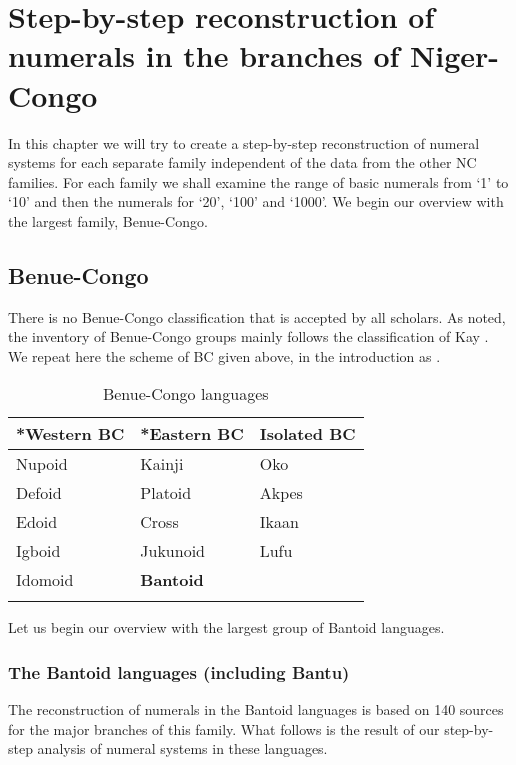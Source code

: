 \chapter{Step-by-step reconstruction of numerals in the branches of Niger-Congo} \label{sec:3}
In this chapter we will try to create a step-by-step reconstruction of numeral systems for each separate family independent of the data from the other NC families. For each family we shall examine the range of basic numerals from ‘1’ to ‘10’ and then the numerals for ‘20’, ‘100’ and ‘1000’. We begin our overview with the largest family, Benue-Congo. 

\section{Benue-Congo} %

There is no Benue-Congo classification that is accepted by all scholars. As noted, the inventory of Benue-Congo groups mainly follows the classification of Kay \citet[266--269]{Williamson1989b}. We repeat here the scheme of BC given above, in the introduction as .

\begin{table}
\caption{Benue-Congo languages}
\label{tab:3:bclg}
\begin{tabularx}{.8\textwidth}{XXl}
\lsptoprule
*Western BC & *Eastern BC & Isolated BC\\
\midrule 
Nupoid & Kainji & Oko\index{Oko!}\\
Defoid & Platoid & Akpes\index{Akpes!} \\
Edoid & Cross & Ikaan\index{Ikaan!}\\
Igboid & Jukunoid & Lufu\index{Lufu!}\\
Idomoid & \textbf{Bantoid} & \\
\lspbottomrule
\end{tabularx}
\end{table}

{\textmd{Let us begin our overview with the largest group of Bantoid languages.}}
 
\subsection{The Bantoid languages (including Bantu)}\label{sec:3.1.1}
The reconstruction of numerals in the Bantoid languages is based on 140 sources for the major branches of this family. What follows is the result of our step-by-step analysis of numeral systems in these languages.

